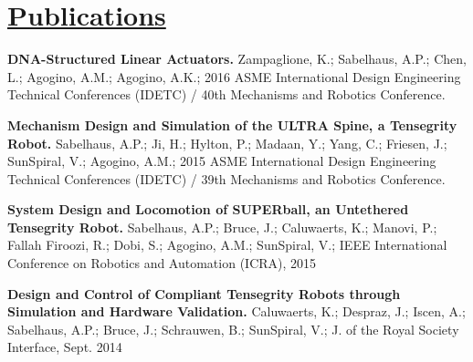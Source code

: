 \documentclass[letterpaper]{deedy-resume} %
\begin{document}
%
%



\begin{minipage}[t]{1\textwidth}%
  
\section{\underline{Publications}}

\vspace{0.4cm}

\begin{tightitemize}

\item \textbf{DNA-Structured Linear Actuators.} Zampaglione, K.; Sabelhaus, A.P.; Chen, L.; Agogino, A.M.; Agogino, A.K.; 2016 ASME International Design Engineering Technical Conferences (IDETC) / 40th Mechanisms and Robotics Conference.
  
\item \textbf{Mechanism Design and Simulation of the ULTRA Spine, a Tensegrity Robot.} Sabelhaus, A.P.; Ji, H.; Hylton, P.; Madaan, Y.; Yang, C.; Friesen, J.; SunSpiral, V.; Agogino, A.M.; 2015 ASME International Design Engineering Technical Conferences (IDETC) / 39th Mechanisms and Robotics Conference.

\item \textbf{System Design and Locomotion of SUPERball, an Untethered Tensegrity Robot.} Sabelhaus, A.P.; Bruce, J.; Caluwaerts, K.; Manovi, P.; Fallah Firoozi, R.; Dobi, S.; Agogino, A.M.; SunSpiral, V.; IEEE International Conference on Robotics and Automation (ICRA), 2015

\item \textbf{Design and Control of Compliant Tensegrity Robots through Simulation and Hardware Validation.} Caluwaerts, K.; Despraz, J.; Iscen, A.; Sabelhaus, A.P.; Bruce, J.; Schrauwen, B.; SunSpiral, V.;  J. of the Royal Society Interface, Sept. 2014


\end{tightitemize}
\end{minipage}
\end{document}
